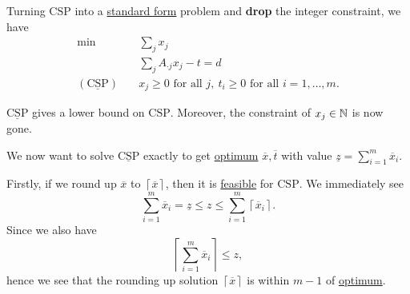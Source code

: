 \begin{answer}
	Turning \(\mathrm{CSP}\) into a \hyperref[def:standard-form]{standard form} problem and \textbf{drop} the integer constraint, we have
	\[
		\begin{aligned}
			\min~                           & \sum\limits_{j} x_{j}                                                         \\
			                                & \sum\limits_{j} A_{\cdot j}x_{j} - t = d                                      \\
			(\mathrm{\underline{CSP}})\quad & x_{j}\geq 0 \text{ for all }j,\ t_{i}\geq 0\text{ for all }i = 1, \ldots , m.
		\end{aligned}
	\]

	\begin{note}
		\(\mathrm{\underline{CSP}}\) gives a lower bound on \(\mathrm{CSP}\). Moreover, the constraint of \(x_{j}\in\mathbb{\MakeUppercase{N}}\)
		is now gone.
	\end{note}

	We now want to solve \(\mathrm{\underline{CSP}}\) exactly to get \hyperref[def:optimal-solution]{optimum} \(\overline{x}, \overline{t}\) with value
	\(\underline{z} = \sum\limits_{i=1}^{m} \overline{x}_{i}\).

	Firstly, if we round up \(\overline{x}\) to \(\left\lceil \overline{x} \right\rceil \), then it is \hyperref[def:feasible-solution]{feasible} for \(\mathrm{CSP}\).
	We immediately see
	\[
		\sum\limits_{i=1}^{m} \overline{x}_{i} = \underline{z} \leq z \leq \sum\limits_{i=1}^{m} \left\lceil \overline{x}_{i} \right\rceil.
	\]
	Since we also have
	\[
		\left\lceil \sum\limits_{i=1}^{m} \overline{x}_{i} \right\rceil \leq z,
	\]
	hence we see that the rounding up solution \(\left\lceil \overline{x} \right\rceil \) is within \(m-1\) of \hyperref[def:optimal-solution]{optimum}.


\end{answer}

